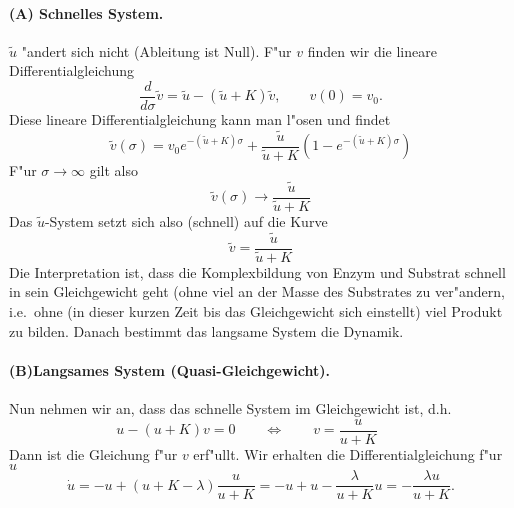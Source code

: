 {\paragraph{\bf (A) Schnelles System.} $\tilde u$ "andert sich nicht (Ableitung ist 
Null). F"ur $v$ finden wir die lineare Differentialgleichung
$$\frac d {d\sigma}\tilde v =   \tilde u-(\tilde u+K) \tilde v, \qquad v(0) = v_0.$$
Diese lineare Differentialgleichung kann man l"osen und findet
$$ \tilde v(\sigma) = v_0 e^{-(\tilde u + K)\sigma} + \frac{\tilde u} {\tilde u + K} (1-e^{-(\tilde u + K)\sigma})
$$
F"ur $\sigma\rightarrow\infty$ gilt also
$$
\tilde v(\sigma)\rightarrow 
\frac{\tilde u} {\tilde u + K}
$$
Das $\tilde u$-System setzt sich also (schnell) auf die Kurve
$$
\tilde v = 
\frac{\tilde u} {\tilde u + K}
$$
Die Interpretation ist, dass die Komplexbildung von Enzym und Substrat schnell in sein
Gleichgewicht geht (ohne viel an der Masse des Substrates zu ver"andern, i.e.\ ohne 
(in dieser kurzen Zeit bis das Gleichgewicht sich einstellt) viel Produkt zu bilden.
Danach bestimmt das langsame System die Dynamik.

\paragraph{\bf (B)Langsames System (Quasi-Gleichgewicht).} Nun nehmen wir an, dass 
das schnelle System im Gleichgewicht ist, d.h.
$$ 
 u-(u+K) v =0\qquad 
\Leftrightarrow\qquad
v = \frac{u}{u+K}\qquad
$$
Dann ist die Gleichung f"ur $v$ erf"ullt. Wir erhalten die Differentialgleichung f"ur $u$
$$ \dot u 
= -u + (u+K-\lambda)\frac{u}{u+K}
= -u + u -\frac{\lambda}{u+K} u = -\frac{\lambda u}{u+K}.
$$
}